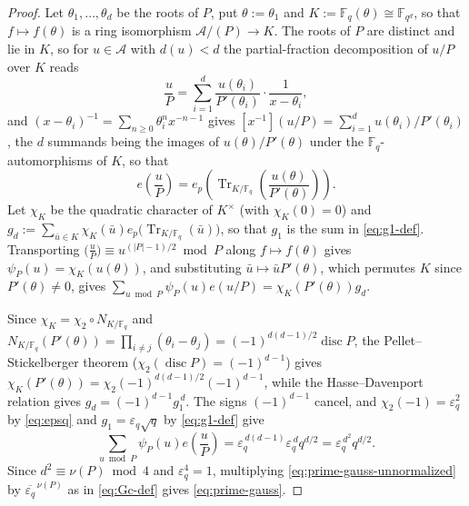 \documentclass[a4paper,reqno]{amsart}
\numberwithin{equation}{section}
\theoremstyle{remark}
\theoremstyle{definition}
\newcommand{\A}{\mathcal{A}}
\newcommand{\epsq}{\varepsilon_q}
\newcommand{\disc}{\operatorname{disc}}
\begin{document}
\begin{proof}
Let $\theta_1,\dots,\theta_d$ be the roots of $P$, put $\theta:=\theta_1$ and
$K:=\mathbb F_q(\theta)\cong\mathbb F_{q^d}$, so that $f\mapsto f(\theta)$ is a
ring isomorphism $\A/(P)\to K$. The roots of $P$ are distinct and lie in
$K$, so for $u\in\A$ with $d(u)<d$ the partial-fraction decomposition of
$u/P$ over $K$ reads
$$
\frac{u}{P}=\sum_{i=1}^{d}\frac{u(\theta_i)}{P'(\theta_i)}
\cdot\frac{1}{x-\theta_i},
$$
and $(x-\theta_i)^{-1}=\sum_{n\ge0}\theta_i^nx^{-n-1}$ gives
$[x^{-1}](u/P)=\sum_{i=1}^{d}u(\theta_i)/P'(\theta_i)$, the $d$ summands
being the images of $u(\theta)/P'(\theta)$ under the
$\mathbb F_q$-automorphisms of $K$, so that
$$
e\!\left(\frac{u}{P}\right)
=e_p\!\left(\operatorname{Tr}_{K/\mathbb F_q}
\!\left(\frac{u(\theta)}{P'(\theta)}\right)\right).
$$
Let $\chi_K$ be the quadratic character of $K^\times$ (with $\chi_K(0)=0$)
and $g_d:=\sum_{\bar u\in K}\chi_K(\bar u)
e_p\bigl(\operatorname{Tr}_{K/\mathbb F_q}(\bar u)\bigr)$, so that $g_1$ is
the sum in \eqref{eq:g1-def}. Transporting
$\bigl(\frac uP\bigr)\equiv u^{(|P|-1)/2}\bmod P$ along $f\mapsto f(\theta)$
gives $\psi_P(u)=\chi_K(u(\theta))$, and substituting
$\bar u\mapsto\bar uP'(\theta)$, which permutes $K$ since $P'(\theta)\ne0$,
gives $\sum_{u\bmod P}\psi_P(u)e(u/P)=\chi_K(P'(\theta))g_d$.

Since $\chi_K=\chi_2\circ N_{K/\mathbb F_q}$ and
$N_{K/\mathbb F_q}(P'(\theta))=\prod_{i\ne j}(\theta_i-\theta_j)
=(-1)^{d(d-1)/2}\disc P$, the Pellet--Stickelberger theorem
\cite[Corollary~1]{Sw62} ($\chi_2(\disc P)=(-1)^{d-1}$) gives
$\chi_K(P'(\theta))=\chi_2(-1)^{d(d-1)/2}(-1)^{d-1}$, while the
Hasse--Davenport relation \cite[Chapter~11, Section~4]{IR90}
gives $g_d=(-1)^{d-1}g_1^{\,d}$. The signs $(-1)^{d-1}$ cancel, and
$\chi_2(-1)=\epsq^2$ by \eqref{eq:epsq} and $g_1=\epsq\sqrt q$ by
\eqref{eq:g1-def} give
\begin{equation}\label{eq:prime-gauss-unnormalized}
\sum_{u\bmod P}\psi_P(u)e\!\left(\frac{u}{P}\right)
=\epsq^{\,d(d-1)}\epsq^{\,d}q^{d/2}=\epsq^{\,d^2}q^{d/2}.
\end{equation}
Since $d^2\equiv\nu(P)\bmod4$ and $\epsq^4=1$, multiplying
\eqref{eq:prime-gauss-unnormalized} by $\overline{\epsq}^{\,\nu(P)}$ as in
\eqref{eq:Gc-def} gives \eqref{eq:prime-gauss}.
\end{proof}
\end{document}

